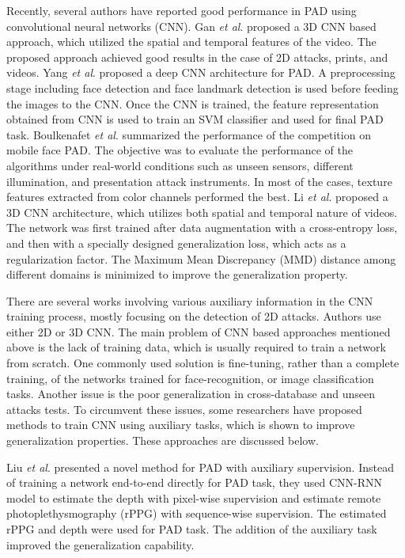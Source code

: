 \documentclass[journal]{IEEEtran}
\begin{document}
Recently, several authors have reported good performance in PAD using convolutional neural networks (CNN). Gan \textit{et al}. \cite{gan20173d} proposed a 3D CNN based approach, which utilized the spatial and temporal features of the video. The proposed approach achieved good results in the case of 2D attacks, prints, and videos. Yang \textit{et al}. \cite{yang2014learn} proposed a deep CNN architecture for PAD. A preprocessing stage including face detection and face landmark detection is used before feeding the images to the CNN. Once the CNN is trained, the feature representation obtained from CNN is used to train an SVM classifier and used for final PAD task. Boulkenafet \textit{et al}. \cite{boulkenafet2017competition} summarized the performance of the competition on mobile face PAD. The objective was to evaluate the performance of the algorithms under real-world conditions such as unseen sensors, different illumination, and presentation attack instruments. In most of the cases, texture features extracted from color channels performed the best. Li \textit{et al}. \cite{li2018learning} proposed a 3D CNN architecture, which utilizes both spatial and temporal nature of videos. The network was first trained after data augmentation with a cross-entropy loss, and then with a specially designed generalization loss, which acts as a regularization factor. The Maximum Mean Discrepancy (MMD) distance among different domains is minimized to improve the generalization property.

There are several works involving various auxiliary information in the CNN training process, mostly focusing on the detection of 2D attacks. Authors use either 2D or 3D CNN. The main problem of CNN based approaches mentioned above is the lack of training data, which is usually required to train a network from scratch. One commonly used solution is fine-tuning, rather than a complete training, of the networks trained for face-recognition, or image classification tasks. Another issue is the poor generalization in cross-database and unseen attacks tests. To circumvent these issues, some researchers have proposed methods to train CNN using auxiliary tasks, which is shown to improve generalization properties. These approaches are discussed below.

Liu \textit{et al}. \cite{liu2018learning} presented a novel method for PAD with auxiliary supervision. Instead of training a network end-to-end directly for PAD task, they used CNN-RNN model to estimate the depth with pixel-wise supervision and estimate remote photoplethysmography (rPPG) with sequence-wise supervision. The estimated rPPG and depth were used for PAD task. The addition of the auxiliary task improved the generalization capability.
\end{document}
